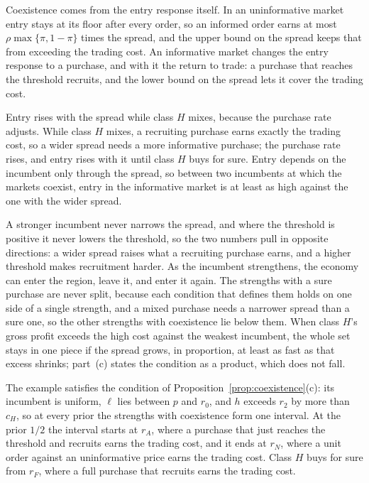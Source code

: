 Coexistence comes from the entry response itself. In an uninformative market entry stays at its floor after every order, so an
informed order earns at most \(\rho\max\{\pi,1-\pi\}\) times the spread, and the upper bound on the spread keeps that
from exceeding the trading cost. An informative market changes the entry response to a purchase, and with it the
return to trade: a purchase that reaches the threshold recruits, and the lower bound on the spread lets it cover the
trading cost.

Entry rises with the spread while class \(H\) mixes, because the purchase rate adjusts. While class \(H\) mixes, a
recruiting purchase earns exactly the trading cost, so a wider spread needs a more informative purchase; the purchase
rate rises, and entry rises with it until class \(H\) buys for sure. Entry depends on the incumbent only through the
spread, so between two incumbents at which the markets coexist, entry in the informative market is at least as high
against the one with the wider spread.

A stronger incumbent never narrows the spread, and where the threshold is positive it never lowers the threshold, so
the two numbers pull in opposite directions: a wider spread raises what a recruiting purchase earns, and a higher
threshold makes recruitment harder. As the incumbent strengthens, the economy can enter the region, leave it, and
enter it again. The strengths with a sure purchase are never split, because each condition that defines them holds on
one side of a single strength, and a mixed purchase needs a narrower spread than a sure one, so the other strengths
with coexistence lie below them. When class \(H\)'s gross profit exceeds the high cost against the weakest incumbent,
the whole set stays in one piece if the spread grows, in proportion, at least as fast as that excess shrinks;
part~(c) states the condition as a product, which does not fall.

The example satisfies the condition of Proposition~\ref{prop:coexistence}(c): its incumbent is uniform, \(\ell\) lies
between \(p\) and \(r_0\), and \(h\) exceeds \(r_2\) by more than \(c_H\), so at every prior the strengths with
coexistence form one interval. At the prior \(1/2\) the interval starts at \(r_A\), where a purchase that just
reaches the threshold and recruits earns the trading cost, and it ends at \(r_N\), where a unit order against an
uninformative price earns the trading cost. Class \(H\) buys for sure from \(r_F\), where a full purchase that
recruits earns the trading cost.

